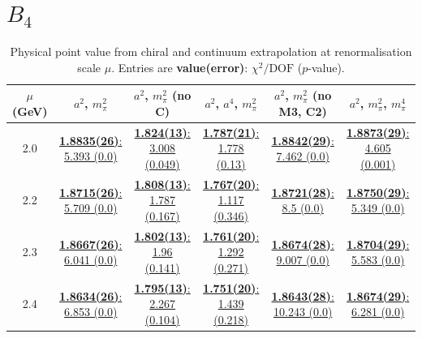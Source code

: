 \documentclass[12pt]{extarticle}
\begin{document}
\section{$B_4$}
\begin{table}[h!]
\begin{center}
\begin{tabular}{|c|c|c|c|c|c|}
\hline
$\mu$ (GeV) & $a^2$, $m_\pi^2$& $a^2$, $m_\pi^2$ (no C)& $a^2$, $a^4$, $m_\pi^2$& $a^2$, $m_\pi^2$ (no M3, C2)& $a^2$, $m_\pi^2$, $m_\pi^4$\\
\hline
2.0& \hyperlink{SSpPP/SUSY/a2m2_20.pdf.1}{\textbf{1.8835(26)}: 5.393 (0.0)} & \hyperlink{SSpPP/SUSY/a2m2noC_20.pdf.1}{\textbf{1.824(13)}: 3.008 (0.049)} & \hyperlink{SSpPP/SUSY/a2a4m2_20.pdf.1}{\textbf{1.787(21)}: 1.778 (0.13)} & \hyperlink{SSpPP/SUSY/a2m2mcut_20.pdf.1}{\textbf{1.8842(29)}: 7.462 (0.0)} & \hyperlink{SSpPP/SUSY/a2m2m4_20.pdf.1}{\textbf{1.8873(29)}: 4.605 (0.001)}\\
2.2& \hyperlink{SSpPP/SUSY/a2m2_22.pdf.1}{\textbf{1.8715(26)}: 5.709 (0.0)} & \hyperlink{SSpPP/SUSY/a2m2noC_22.pdf.1}{\textbf{1.808(13)}: 1.787 (0.167)} & \hyperlink{SSpPP/SUSY/a2a4m2_22.pdf.1}{\textbf{1.767(20)}: 1.117 (0.346)} & \hyperlink{SSpPP/SUSY/a2m2mcut_22.pdf.1}{\textbf{1.8721(28)}: 8.5 (0.0)} & \hyperlink{SSpPP/SUSY/a2m2m4_22.pdf.1}{\textbf{1.8750(29)}: 5.349 (0.0)}\\
2.3& \hyperlink{SSpPP/SUSY/a2m2_23.pdf.1}{\textbf{1.8667(26)}: 6.041 (0.0)} & \hyperlink{SSpPP/SUSY/a2m2noC_23.pdf.1}{\textbf{1.802(13)}: 1.96 (0.141)} & \hyperlink{SSpPP/SUSY/a2a4m2_23.pdf.1}{\textbf{1.761(20)}: 1.292 (0.271)} & \hyperlink{SSpPP/SUSY/a2m2mcut_23.pdf.1}{\textbf{1.8674(28)}: 9.007 (0.0)} & \hyperlink{SSpPP/SUSY/a2m2m4_23.pdf.1}{\textbf{1.8704(29)}: 5.583 (0.0)}\\
2.4& \hyperlink{SSpPP/SUSY/a2m2_24.pdf.1}{\textbf{1.8634(26)}: 6.853 (0.0)} & \hyperlink{SSpPP/SUSY/a2m2noC_24.pdf.1}{\textbf{1.795(13)}: 2.267 (0.104)} & \hyperlink{SSpPP/SUSY/a2a4m2_24.pdf.1}{\textbf{1.751(20)}: 1.439 (0.218)} & \hyperlink{SSpPP/SUSY/a2m2mcut_24.pdf.1}{\textbf{1.8643(28)}: 10.243 (0.0)} & \hyperlink{SSpPP/SUSY/a2m2m4_24.pdf.1}{\textbf{1.8674(29)}: 6.281 (0.0)}\\
\hline
\end{tabular}
\caption{Physical point value from chiral and continuum extrapolation at renormalisation scale $\mu$. Entries are \textbf{value(error)}: $\chi^2/\text{DOF}$ ($p$-value).}
\end{center}
\end{table}
\end{document}
